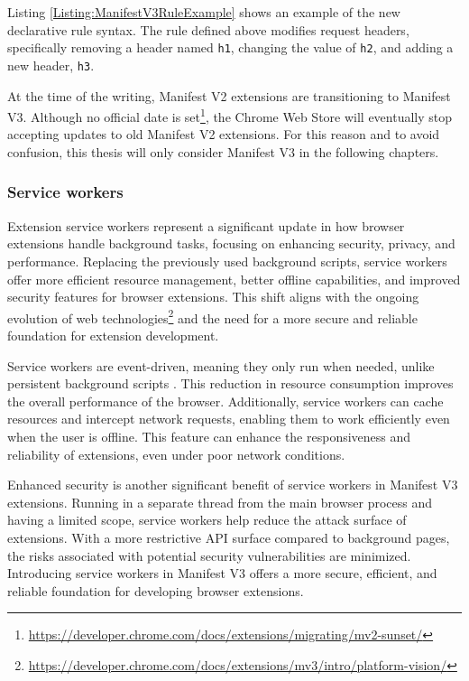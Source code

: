 \medbreak

Listing \ref{Listing:ManifestV3RuleExample} shows an example of the new declarative rule syntax. The rule defined above modifies request headers, specifically removing a header named \texttt{h1}, changing the value of \texttt{h2}, and adding a new header, \texttt{h3}.

At the time of the writing, Manifest V2 extensions are transitioning to Manifest V3. Although no official date is set\footnote{\url{https://developer.chrome.com/docs/extensions/migrating/mv2-sunset/}}, the Chrome Web Store will eventually stop accepting updates to old Manifest V2 extensions. For this reason and to avoid confusion, this thesis will only consider Manifest V3 in the following chapters.

\subsubsection{Service workers}

Extension service workers represent a significant update in how browser extensions handle background tasks, focusing on enhancing security, privacy, and performance. Replacing the previously used background scripts, service workers offer more efficient resource management, better offline capabilities, and improved security features for browser extensions. This shift aligns with the ongoing evolution of web technologies\footnote{{\url{https://developer.chrome.com/docs/extensions/mv3/intro/platform-vision/}}} and the need for a more secure and reliable foundation for extension development.

Service workers are event-driven, meaning they only run when needed, unlike persistent background scripts \cite{ChromeWebExtensions}. This reduction in resource consumption improves the overall performance of the browser. Additionally, service workers can cache resources and intercept network requests, enabling them to work efficiently even when the user is offline. This feature can enhance the responsiveness and reliability of extensions, even under poor network conditions.

Enhanced security is another significant benefit of service workers in Manifest V3 extensions. Running in a separate thread from the main browser process and having a limited scope, service workers help reduce the attack surface of extensions. With a more restrictive API surface compared to background pages, the risks associated with potential security vulnerabilities are minimized. Introducing service workers in Manifest V3 offers a more secure, efficient, and reliable foundation for developing browser extensions.

